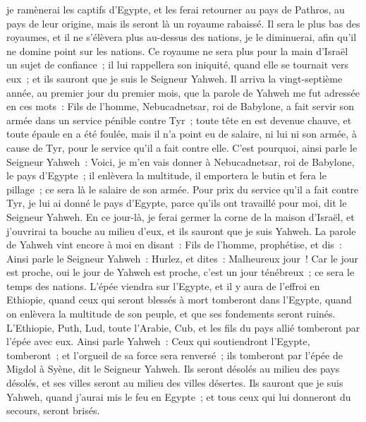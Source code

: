 \begin{multicols}{2}
je ramènerai les captifs d'Egypte, et les ferai retourner au pays de Pathros, au pays de leur origine, mais ils seront là un royaume rabaissé.
Il sera le plus bas des royaumes, et il ne s'élèvera plus au-dessus des nations, je le diminuerai, afin qu'il ne domine point sur les nations.
Ce royaume ne sera plus pour la main d'Israël un sujet de confiance~; il lui rappellera son iniquité, quand elle se tournait vers eux~; et ils sauront que je suis le Seigneur Yahweh.
Il arriva la vingt-septième année, au premier jour du premier mois, que la parole de Yahweh me fut adressée en ces mots~:
Fils de l'homme, Nebucadnetsar, roi de Babylone, a fait servir son armée dans un service pénible contre Tyr~; toute tête en est devenue chauve, et toute épaule en a été foulée, mais il n'a point eu de salaire, ni lui ni son armée, à cause de Tyr, pour le service qu'il a fait contre elle.
C'est pourquoi, ainsi parle le Seigneur Yahweh~: Voici, je m'en vais donner à Nebucadnetsar, roi de Babylone, le pays d'Egypte~; il enlèvera la multitude, il emportera le butin et fera le pillage~; ce sera là le salaire de son armée.
Pour prix du service qu'il a fait contre Tyr, je lui ai donné le pays d'Egypte, parce qu'ils ont travaillé pour moi, dit le Seigneur Yahweh.
En ce jour-là, je ferai germer la corne de la maison d'Israël, et j'ouvrirai ta bouche au milieu d'eux, et ils sauront que je suis Yahweh.
\VerseOne{}La parole de Yahweh vint encore à moi en disant~:
Fils de l'homme, prophétise, et dis~: Ainsi parle le Seigneur Yahweh~: Hurlez, et dites~: Malheureux jour~!
Car le jour est proche, oui le jour de Yahweh est proche, c'est un jour ténébreux~; ce sera le temps des nations.
L'épée viendra sur l'Egypte, et il y aura de l'effroi en Ethiopie, quand ceux qui seront blessés à mort tomberont dans l'Egypte, quand on enlèvera la multitude de son peuple, et que ses fondements seront ruinés.
L'Ethiopie, Puth, Lud, toute l'Arabie, Cub, et les fils du pays allié tomberont par l'épée avec eux.
Ainsi parle Yahweh~: Ceux qui soutiendront l'Egypte, tomberont~; et l'orgueil de sa force sera renversé~; ils tomberont par l'épée de Migdol à Syène, dit le Seigneur Yahweh.
Ils seront désolés au milieu des pays désolés, et ses villes seront au milieu des villes désertes.
Ils sauront que je suis Yahweh, quand j'aurai mis le feu en Egypte~; et tous ceux qui lui donneront du secours, seront brisés.

\end{multicols}
